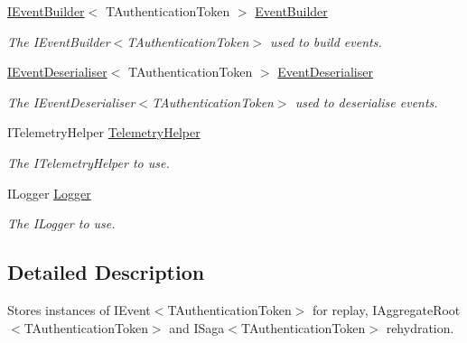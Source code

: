 \begin{DoxyCompactItemize}
\item 
\hyperlink{interfaceCqrs_1_1Events_1_1IEventBuilder}{I\+Event\+Builder}$<$ T\+Authentication\+Token $>$ \hyperlink{classCqrs_1_1Events_1_1EventStore_a05393aedf2eae4b2eeae3977e7f1c6f9_a05393aedf2eae4b2eeae3977e7f1c6f9}{Event\+Builder}
\begin{DoxyCompactList}\small\item\em The I\+Event\+Builder$<$\+T\+Authentication\+Token$>$ used to build events. \end{DoxyCompactList}\item 
\hyperlink{interfaceCqrs_1_1Events_1_1IEventDeserialiser}{I\+Event\+Deserialiser}$<$ T\+Authentication\+Token $>$ \hyperlink{classCqrs_1_1Events_1_1EventStore_a24f17302c069058e5814dedfb614d599_a24f17302c069058e5814dedfb614d599}{Event\+Deserialiser}
\begin{DoxyCompactList}\small\item\em The I\+Event\+Deserialiser$<$\+T\+Authentication\+Token$>$ used to deserialise events. \end{DoxyCompactList}\item 
I\+Telemetry\+Helper \hyperlink{classCqrs_1_1Events_1_1EventStore_a75d6d3ad3a26fb9b511e2a98e72260f9_a75d6d3ad3a26fb9b511e2a98e72260f9}{Telemetry\+Helper}
\begin{DoxyCompactList}\small\item\em The I\+Telemetry\+Helper to use. \end{DoxyCompactList}\item 
I\+Logger \hyperlink{classCqrs_1_1Events_1_1EventStore_a99506f7136a658364f8b74ef6a779a3f_a99506f7136a658364f8b74ef6a779a3f}{Logger}
\begin{DoxyCompactList}\small\item\em The I\+Logger to use. \end{DoxyCompactList}\end{DoxyCompactItemize}


\subsection{Detailed Description}
Stores instances of I\+Event$<$\+T\+Authentication\+Token$>$ for replay, I\+Aggregate\+Root$<$\+T\+Authentication\+Token$>$ and I\+Saga$<$\+T\+Authentication\+Token$>$ rehydration. 


